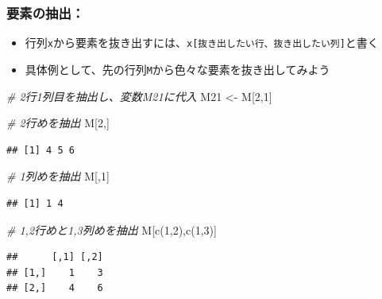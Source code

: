 \documentclass[
]{book}
\newenvironment{Shaded}{\begin{snugshade}}{\end{snugshade}}
\newcommand{\CommentTok}[1]{\textcolor[rgb]{0.56,0.35,0.01}{\textit{#1}}}
\newcommand{\DecValTok}[1]{\textcolor[rgb]{0.00,0.00,0.81}{#1}}
\newcommand{\FunctionTok}[1]{\textcolor[rgb]{0.00,0.00,0.00}{#1}}
\newcommand{\NormalTok}[1]{#1}
\newcommand{\OtherTok}[1]{\textcolor[rgb]{0.56,0.35,0.01}{#1}}
\providecommand{\tightlist}{%
  \setlength{\itemsep}{0pt}\setlength{\parskip}{0pt}}
\begin{document}
\hypertarget{ux8981ux7d20ux306eux62bdux51fa-1}{%
\subsubsection*{要素の抽出：}\label{ux8981ux7d20ux306eux62bdux51fa-1}}

\begin{itemize}
\tightlist
\item
  行列\texttt{x}から要素を抜き出すには、\texttt{x{[}抜き出したい行、抜き出したい列{]}}と書く
\item
  具体例として、先の行列\texttt{M}から色々な要素を抜き出してみよう
\end{itemize}

\begin{Shaded}
\begin{Highlighting}[]
\CommentTok{\# 2行1列目を抽出し、変数M21に代入}
\NormalTok{M21 }\OtherTok{\textless{}{-}}\NormalTok{ M[}\DecValTok{2}\NormalTok{,}\DecValTok{1}\NormalTok{]}

\CommentTok{\# 2行めを抽出}
\NormalTok{M[}\DecValTok{2}\NormalTok{,]}
\end{Highlighting}
\end{Shaded}

\begin{verbatim}
## [1] 4 5 6
\end{verbatim}

\begin{Shaded}
\begin{Highlighting}[]
\CommentTok{\# 1列めを抽出}
\NormalTok{M[,}\DecValTok{1}\NormalTok{]}
\end{Highlighting}
\end{Shaded}

\begin{verbatim}
## [1] 1 4
\end{verbatim}

\begin{Shaded}
\begin{Highlighting}[]
\CommentTok{\# 1,2行めと1,3列めを抽出}
\NormalTok{M[}\FunctionTok{c}\NormalTok{(}\DecValTok{1}\NormalTok{,}\DecValTok{2}\NormalTok{),}\FunctionTok{c}\NormalTok{(}\DecValTok{1}\NormalTok{,}\DecValTok{3}\NormalTok{)]}
\end{Highlighting}
\end{Shaded}

\begin{verbatim}
##      [,1] [,2]
## [1,]    1    3
## [2,]    4    6
\end{verbatim}
\end{document}
